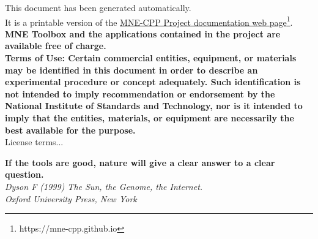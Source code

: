 \documentclass[12pt, twoside]{article}
\newcommand{\versionnumber}{0.1.9}
\begin{document}
\begin{titlepage}
\noindent \normalsize This document has been generated automatically. \\
It is a printable version of the \href{https://mne-cpp.github.io}{MNE-CPP Project documentation web page}\footnote{https://mne-cpp.github.io}.
\vfill
\noindent\normalsize \textbf{MNE Toolbox and the applications contained in the project are available free of charge.} \\
\vfill	
\noindent
\footnotesize \noindent \textbf{Terms of Use: Certain commercial entities, equipment, or materials may be identified in this document in order to describe an experimental procedure or concept adequately. Such identification is not intended to imply recommendation or endorsement by the National Institute of Standards and Technology, nor is it intended to imply that the entities, materials, or equipment are necessarily the best available for the purpose.}\\ 
\vfill
\footnotesize License terms...
\vfill
\end{titlepage}


\begin{titlepage}
\begin{flushright}
\vspace*{\fill}
\noindent\normalsize\textbf{If the tools are good, nature will give a clear answer to a clear question.} \\
\textit{Dyson F (1999) The Sun, the Genome, the Internet. \\Oxford University Press, New York} \\
\vspace*{\fill}
\end{flushright}
\end{titlepage}


\fancyhf{}
\fancyhead[CE]{Version: \versionnumber}
\fancyhead[RE]{\today}
\fancyhead[LO]{\nouppercase\leftmark}
\fancyhead[RO]{\nouppercase\rightmark}
\renewcommand{\subsectionmark}[1]{\markright{\thesubsection\ #1}}
\setlength\headheight{26pt}
\fancyheadoffset{0cm} 
\end{document}
